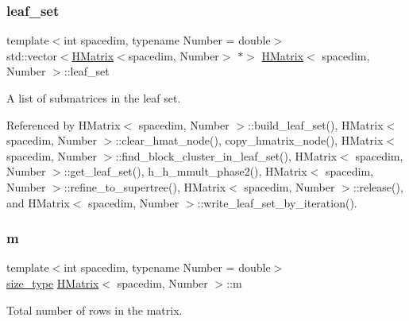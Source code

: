 \mbox{\label{classHMatrix_a61dbd471077be0ad8325d0f2afe3d43f}} 
\subsubsection{\texorpdfstring{leaf\+\_\+set}{leaf\_set}}
{\footnotesize\ttfamily template$<$int spacedim, typename Number = double$>$ \\
std\+::vector$<$\hyperlink{classHMatrix}{H\+Matrix}$<$spacedim, Number$>$ $\ast$$>$ \hyperlink{classHMatrix}{H\+Matrix}$<$ spacedim, Number $>$\+::leaf\+\_\+set\hspace{0.3cm}{\ttfamily [private]}}

A list of submatrices in the leaf set. 

Referenced by H\+Matrix$<$ spacedim, Number $>$\+::build\+\_\+leaf\+\_\+set(), H\+Matrix$<$ spacedim, Number $>$\+::clear\+\_\+hmat\+\_\+node(), copy\+\_\+hmatrix\+\_\+node(), H\+Matrix$<$ spacedim, Number $>$\+::find\+\_\+block\+\_\+cluster\+\_\+in\+\_\+leaf\+\_\+set(), H\+Matrix$<$ spacedim, Number $>$\+::get\+\_\+leaf\+\_\+set(), h\+\_\+h\+\_\+mmult\+\_\+phase2(), H\+Matrix$<$ spacedim, Number $>$\+::refine\+\_\+to\+\_\+supertree(), H\+Matrix$<$ spacedim, Number $>$\+::release(), and H\+Matrix$<$ spacedim, Number $>$\+::write\+\_\+leaf\+\_\+set\+\_\+by\+\_\+iteration().

\mbox{\label{classHMatrix_aa5523463043e4d542eae17d262bd22ad}} 
\subsubsection{\texorpdfstring{m}{m}}
{\footnotesize\ttfamily template$<$int spacedim, typename Number = double$>$ \\
\hyperlink{classHMatrix_a5ca8dc549783d38371a01ecd621ecb34}{size\+\_\+type} \hyperlink{classHMatrix}{H\+Matrix}$<$ spacedim, Number $>$\+::m\hspace{0.3cm}{\ttfamily [private]}}

Total number of rows in the matrix. 


